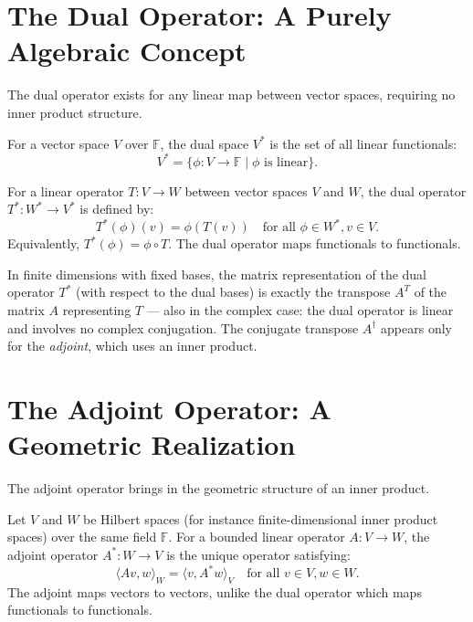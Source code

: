 \begin{notechapter}
\section{The Dual Operator: A Purely Algebraic Concept}

The dual operator exists for any linear map between vector spaces, requiring no inner product structure.

\begin{definition}
For a vector space $V$ over $\mathbb{F}$, the dual space $V^*$ is the set of all linear functionals:
\[
V^* = \{ \phi : V \to \mathbb{F} \mid \phi \text{ is linear} \}.
\]
\end{definition}

\begin{definition}
For a linear operator $T : V \to W$ between vector spaces $V$ and $W$, the dual operator $T^* : W^* \to V^*$ is defined by:
\[
T^*(\phi)(v) = \phi(T(v)) \quad \text{for all } \phi \in W^*, v \in V.
\]
Equivalently, $T^*(\phi) = \phi \circ T$. The dual operator maps functionals to functionals.
\end{definition}

In finite dimensions with fixed bases, the matrix representation of the dual operator $T^*$ (with respect to the dual bases) is exactly the transpose $A^T$ of the matrix $A$ representing $T$ --- also in the complex case: the dual operator is linear and involves no complex conjugation. The conjugate transpose $A^\dagger$ appears only for the \emph{adjoint}, which uses an inner product.

\section{The Adjoint Operator: A Geometric Realization}

The adjoint operator brings in the geometric structure of an inner product.

\begin{definition}
Let $V$ and $W$ be Hilbert spaces (for instance finite-dimensional inner product spaces) over the same field $\mathbb{F}$. For a bounded linear operator $A : V \to W$, the adjoint operator $A^* : W \to V$ is the unique operator satisfying:
\[
\langle Av, w \rangle_W = \langle v, A^*w \rangle_V \quad \text{for all } v \in V, w \in W.
\]
The adjoint maps vectors to vectors, unlike the dual operator which maps functionals to functionals.
\end{definition}


\end{notechapter}
